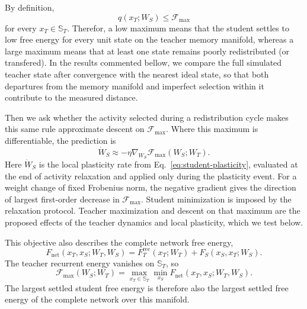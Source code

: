 \documentclass[10pt,letterpaper]{article}
\theoremstyle{plain}
\theoremstyle{remark}
\begin{document}
By definition, 
\[
q(x_T;W_S)\leq\mathcal F_{\max}
\]
for every \(x_T\in\mathbb S_T\). Therefor, a low maximum means that the student settles to low free energy for every unit state on the teacher memory manifold, whereas a large maximum means that at least one state remains poorly redistributed (or transfered). In the results commented bellow, we compare the full simulated teacher state after convergence with the nearest ideal state, so that both departures from the memory manifold and imperfect selection within it contribute to the measured distance.

Then we ask whether the activity selected during a redistribution cycle makes this same rule approximate descent on \(\mathcal F_{\max}\). Where this maximum is differentiable, the prediction is
\begin{equation}
\dot W_S\approx-\eta\nabla_{W_S}\mathcal F_{\max}(W_S;W_T).
\label{eq:empirical-plasticity-hypothesis}
\end{equation}
Here \(\dot W_S\) is the local plasticity rate from Eq.~\eqref{eq:student-plasticity}, evaluated at the end of activity relaxation and applied only during the plasticity event. For a weight change of fixed Frobenius norm, the negative gradient gives the direction of largest first-order decrease in \(\mathcal F_{\max}\). Student minimization is imposed by the relaxation protocol. Teacher maximization and descent on that maximum are the proposed effects of the teacher dynamics and local plasticity, which we test below.

This objective also describes the complete network free energy,
\begin{equation}
F_{\mathrm{net}}(x_T,x_S;W_T,W_S)
=F_T^{\mathrm{rec}}(x_T;W_T)+F_S(x_S,x_T;W_S).
\label{eq:empirical-network-energy}
\end{equation}
The teacher recurrent energy vanishes on \(\mathbb S_T\), so
\begin{equation}
\mathcal F_{\max}(W_S;W_T)
=\max_{x_T\in\mathbb S_T}\min_{x_S}F_{\mathrm{net}}(x_T,x_S;W_T,W_S).
\label{eq:empirical-network-student-equivalence}
\end{equation}
The largest settled student free energy is therefore also the largest settled free energy of the complete network over this manifold.
\end{document}
